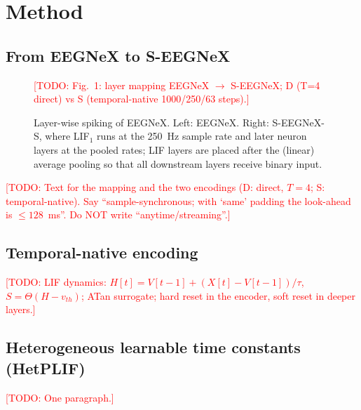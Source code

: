\documentclass{article}
\newcommand{\todo}[1]{\textcolor{red}{[TODO: #1]}}
\begin{document}
\section{Method}
\label{sec:method}

\subsection{From EEGNeX to S-EEGNeX}
\label{ssec:mapping}
\begin{figure}[t]
  \centering
  \todo{Fig.~1: layer mapping EEGNeX $\rightarrow$ S-EEGNeX; D (T=4 direct) vs S (temporal-native 1000/250/63 steps).}
  \caption{Layer-wise spiking of EEGNeX. Left: EEGNeX. Right: S-EEGNeX-S, where LIF$_1$ runs at the 250~Hz sample rate and later neuron layers at the pooled rates; LIF layers are placed after the (linear) average pooling so that all downstream layers receive binary input.}
  \label{fig:mapping}
\end{figure}
\todo{Text for the mapping and the two encodings (D: direct, $T{=}4$; S: temporal-native). Say ``sample-synchronous; with `same' padding the look-ahead is $\le 128$~ms''. Do NOT write ``anytime/streaming''.}

\subsection{Temporal-native encoding}
\label{ssec:encoding}
\todo{LIF dynamics: $H[t]=V[t-1]+(X[t]-V[t-1])/\tau$, $S=\Theta(H-v_{th})$; ATan surrogate; hard reset in the encoder, soft reset in deeper layers.}

\subsection{Heterogeneous learnable time constants (HetPLIF)}
\label{ssec:hetplif}
\todo{One paragraph.}
\end{document}
